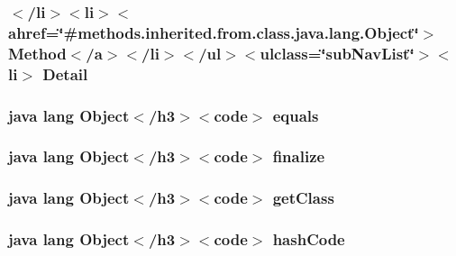 \hypertarget{_build_config_8html_aed0df2ae11502bf9389ac3cf53b1c0f6}{
\subsubsection[{Detail}]{\setlength{\rightskip}{0pt plus 5cm}$<$/li$>$$<$li$>$$<$ahref=\char`\"{}\#methods.\-inherited.\-from.\-class.\-java.\-lang.\-Object\char`\"{}$>$ Method$<$/{\bf a}$>$$<$/li$>$$<$/ul$>$$<$ulclass=\char`\"{}sub\-Nav\-List\char`\"{}$>$$<$li$>$ Detail}}\label{_build_config_8html_aed0df2ae11502bf9389ac3cf53b1c0f6}
\hypertarget{_build_config_8html_a8974318cea585f72df717e0380ec7104}{
\subsubsection[{equals}]{\setlength{\rightskip}{0pt plus 5cm}java lang Object$<$/h3$>$$<$code$>$ equals}}\label{_build_config_8html_a8974318cea585f72df717e0380ec7104}
\hypertarget{_build_config_8html_ab2315181ead4aeedef2374039b6ddde7}{
\subsubsection[{finalize}]{\setlength{\rightskip}{0pt plus 5cm}java lang Object$<$/h3$>$$<$code$>$ finalize}}\label{_build_config_8html_ab2315181ead4aeedef2374039b6ddde7}
\hypertarget{_build_config_8html_a98e6644727fe65eac217a6855045be43}{
\subsubsection[{get\-Class}]{\setlength{\rightskip}{0pt plus 5cm}java lang Object$<$/h3$>$$<$code$>$ get\-Class}}\label{_build_config_8html_a98e6644727fe65eac217a6855045be43}
\hypertarget{_build_config_8html_a8e178e2bb2bef055ea23ea3910a221ca}{
\subsubsection[{hash\-Code}]{\setlength{\rightskip}{0pt plus 5cm}java lang Object$<$/h3$>$$<$code$>$ hash\-Code}}\label{_build_config_8html_a8e178e2bb2bef055ea23ea3910a221ca}
